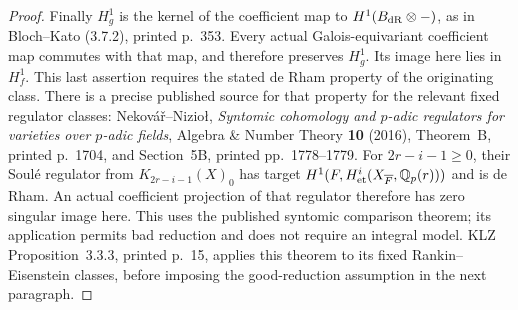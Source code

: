 \begin{proof}
Finally \(H_g^1\) is the kernel of the coefficient map to
\(H^1(B_{\rm dR}\otimes- )\), as in Bloch--Kato
(3.7.2), printed p.~353. Every actual Galois-equivariant
coefficient map commutes with that map, and therefore
preserves \(H_g^1\). Its image here lies in \(H_f^1\).
This last assertion requires the stated de Rham property of
the originating class. There is a precise published source
for that property for the relevant fixed regulator classes:
Nekov\'a\v{r}--Nizio\l, \emph{Syntomic cohomology and
\(p\)-adic regulators for varieties over \(p\)-adic fields},
Algebra \& Number Theory \textbf{10} (2016),
Theorem~B, printed p.~1704, and Section~5B,
printed pp.~1778--1779. For \(2r-i-1\ge0\), their
Soul\'e regulator from \(K_{2r-i-1}(X)_0\) has target
\(H^1(F,H^i_{\rm et}(X_{\overline F},\mathbb Q_p(r)))\)
and is de Rham. An actual coefficient projection of that
regulator therefore has zero singular image here.
This uses the published syntomic comparison theorem;
its application permits bad reduction and does not require
an integral model. KLZ Proposition~3.3.3, printed p.~15,
applies this theorem to its fixed Rankin--Eisenstein classes,
before imposing the good-reduction assumption in the next
paragraph.
\end{proof}

